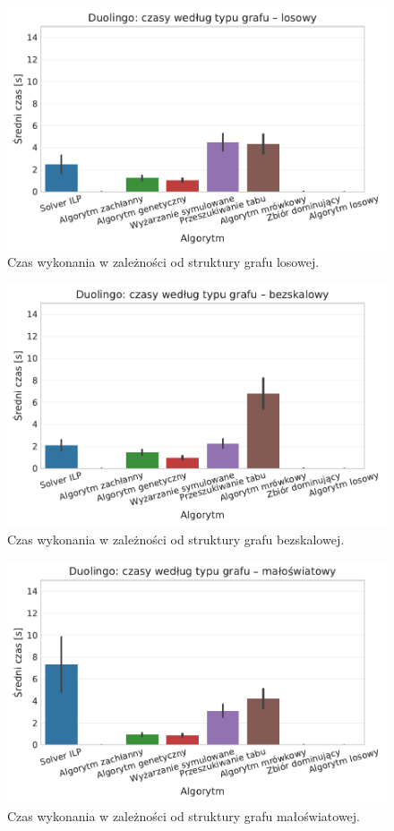 \begin{figure}[H]
  \centering
  \includegraphics[width=0.65\linewidth]{assets/figures/benchmark/synthetic/duolingo_time_by_graph_random.pdf}
  \caption{Czas wykonania w zależności od struktury grafu losowej.}
  \label{fig:duo-synth-time-random}
\end{figure}

\begin{figure}[H]
  \centering
  \includegraphics[width=0.65\linewidth]{assets/figures/benchmark/synthetic/duolingo_time_by_graph_scale_free.pdf}
  \caption{Czas wykonania w zależności od struktury grafu bezskalowej.}
  \label{fig:duo-synth-time-scale-free}
\end{figure}

\begin{figure}[H]
  \centering
  \includegraphics[width=0.65\linewidth]{assets/figures/benchmark/synthetic/duolingo_time_by_graph_small_world.pdf}
  \caption{Czas wykonania w zależności od struktury grafu małoświatowej.}
  \label{fig:duo-synth-time-small-world}
\end{figure}

